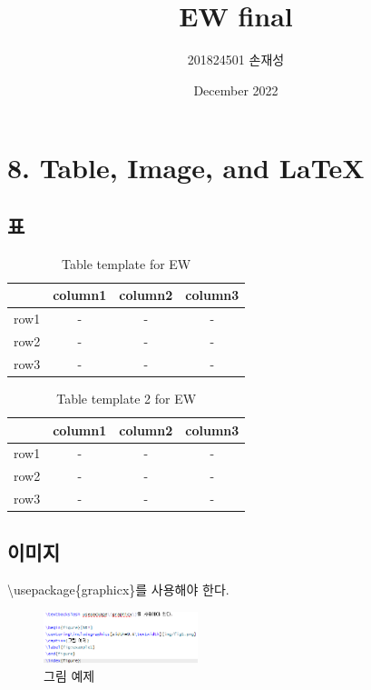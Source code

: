 \documentclass{article}
\title{EW final}
\author{201824501 손재성}
\date{December 2022}
\begin{document}
\maketitle
\section{8. Table, Image, and \LaTeX}
\subsection {표}

\begin{table}[ht!]
\centering
\caption{Table template for EW}
\label{t1}
\begin{tabular}{|c|c|c|c|}
\noalign{\smallskip}\noalign{\smallskip}\hline
& column1 & column2 & column3 \\
\hline 
row1 & - & - & - \\
\hline
row2 & - & - & - \\
\hline
row3 & - & - & - \\
\hline
\end{tabular}
\end{table}

\begin{table}[ht!]
\centering
\caption{Table template 2 for EW}
\label{t2}
\begin{tabular}{c|ccc}
\noalign{\smallskip}\noalign{\smallskip}\hline\hline
& column1 & column2 & column3  \\
\hline
row1 & - & - & - \\
\hline
row2 & - & - & - \\
\hline
row3 & - & - & - \\
\hline
\hline
\end{tabular}
\end{table}

\subsection{이미지}

\textbackslash usepackage\{graphicx\}를 사용해야 한다.
\begin{figure}[ht!]
\centering
\includegraphics[width=0.4\textwidth]{img/fig1.png}
\caption{그림 예제}
\label{fig:example1}
\end{figure}
\end{document}
